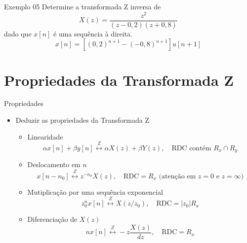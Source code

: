 \begin{slide}{Exemplo 05}
Determine a transformada Z inversa de
   \begin{equation*}
      X(z) = \frac{z^2}{(z-0,2)(z+0,8)}
   \end{equation*}
   dado 	que $x[n]$ é uma sequência à direita.\pause
   \begin{equation*}
      x[n] = [(0,2)^{n+1} -(-0,8)^{n+1}] u[n+1]
   \end{equation*}
\end{slide}


\section[slide=true]{Propriedades da Transformada Z}
\begin{slide}{Propriedades}
\begin{itemize}
 \item Deduzir as propriedades da Transformada Z
   \begin{itemize}
      \item Linearidade 
      \begin{equation*} 
        \alpha x[n] + \beta y[n] \overset{Z}{\longleftrightarrow} \alpha X(z)+\beta Y(z), \quad \text{RDC contém } R_x\cap R_y
      \end{equation*}
      
      \item Deslocamento em $n$
      \begin{equation*} 
        x[n-n_0]  \overset{Z}{\longleftrightarrow} z^{-n_0}X(z), \quad \text{RDC}= R_x \text{ (atenção em } z= 0 \text{ e } z= \infty \text{)}
      \end{equation*}
      
      \item Mutiplicação por uma sequência exponencial
      \begin{equation*} 
        z_0^nx[n] \overset{Z}{\longleftrightarrow} X(z/z_0), \quad \text{RDC}=|z_0| R_x
      \end{equation*}
      
      \item Diferenciação de $X(z)$
      \begin{equation*} 
        nx[n] \overset{Z}{\longleftrightarrow} -z\frac{X(z)}{dz}, \quad \text{RDC}=R_x
      \end{equation*}
      
   \end{itemize}
\end{itemize}
\end{slide}

